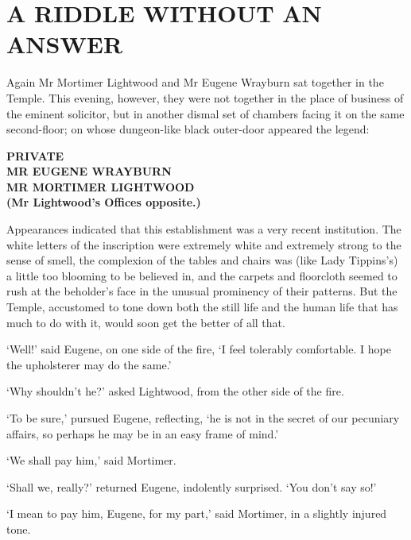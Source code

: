 
\chapter{A RIDDLE WITHOUT AN ANSWER}

Again Mr Mortimer Lightwood and Mr Eugene Wrayburn sat together in the
Temple. This evening, however, they were not together in the place of
business of the eminent solicitor, but in another dismal set of
chambers facing it on the same second-floor; on whose dungeon-like black
outer-door appeared the legend:

\begin{center}
		\textbf{PRIVATE}\\[2pt]

		\textbf{MR EUGENE WRAYBURN}\\[2pt]

		\textbf{MR MORTIMER LIGHTWOOD}\\[2pt]

		\textbf{(Mr Lightwood’s Offices opposite.)}\\[2pt]
\end{center}

Appearances indicated that this establishment was a very recent
institution. The white letters of the inscription were extremely white
and extremely strong to the sense of smell, the complexion of the
tables and chairs was (like Lady Tippins’s) a little too blooming to
be believed in, and the carpets and floorcloth seemed to rush at the
beholder’s face in the unusual prominency of their patterns. But the
Temple, accustomed to tone down both the still life and the human life
that has much to do with it, would soon get the better of all that.

‘Well!’ said Eugene, on one side of the fire, ‘I feel tolerably
comfortable. I hope the upholsterer may do the same.’

‘Why shouldn’t he?’ asked Lightwood, from the other side of the fire.

‘To be sure,’ pursued Eugene, reflecting, ‘he is not in the secret of
our pecuniary affairs, so perhaps he may be in an easy frame of mind.’

‘We shall pay him,’ said Mortimer.

‘Shall we, really?’ returned Eugene, indolently surprised. ‘You don’t
say so!’

‘I mean to pay him, Eugene, for my part,’ said Mortimer, in a slightly
injured tone.

